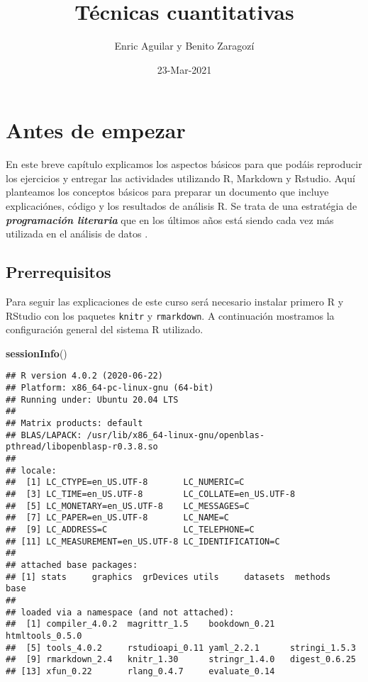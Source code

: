 \documentclass[
]{book}
\title{Técnicas cuantitativas}
\author{Enric Aguilar y Benito Zaragozí}
\date{23-Mar-2021}
\newenvironment{Shaded}{\begin{snugshade}}{\end{snugshade}}
\newcommand{\KeywordTok}[1]{\textcolor[rgb]{0.13,0.29,0.53}{\textbf{#1}}}
\newcommand{\NormalTok}[1]{#1}
\begin{document}
\maketitle

{
\setcounter{tocdepth}{1}
\tableofcontents
}
\hypertarget{antes-de-empezar}{%
\chapter*{Antes de empezar}\label{antes-de-empezar}}

En este breve capítulo explicamos los aspectos básicos para que podáis reproducir los ejercicios y entregar las actividades utilizando R, Markdown y Rstudio. Aquí planteamos los conceptos básicos para preparar un documento que incluye explicaciónes, código y los resultados de análisis R. Se trata de una estratégia de \textbf{\emph{programación literaria}} que en los últimos años está siendo cada vez más utilizada en el análisis de datos \citep{knuth1984literate, xie2015knitr}.

\hypertarget{prerrequisitos}{%
\section{Prerrequisitos}\label{prerrequisitos}}

Para seguir las explicaciones de este curso será necesario instalar primero R y RStudio con los paquetes \texttt{knitr} y \texttt{rmarkdown}. A continuación mostramos la configuración general del sistema R utilizado.

\begin{Shaded}
\begin{Highlighting}[]
\KeywordTok{sessionInfo}\NormalTok{()}
\end{Highlighting}
\end{Shaded}

\begin{verbatim}
## R version 4.0.2 (2020-06-22)
## Platform: x86_64-pc-linux-gnu (64-bit)
## Running under: Ubuntu 20.04 LTS
## 
## Matrix products: default
## BLAS/LAPACK: /usr/lib/x86_64-linux-gnu/openblas-pthread/libopenblasp-r0.3.8.so
## 
## locale:
##  [1] LC_CTYPE=en_US.UTF-8       LC_NUMERIC=C              
##  [3] LC_TIME=en_US.UTF-8        LC_COLLATE=en_US.UTF-8    
##  [5] LC_MONETARY=en_US.UTF-8    LC_MESSAGES=C             
##  [7] LC_PAPER=en_US.UTF-8       LC_NAME=C                 
##  [9] LC_ADDRESS=C               LC_TELEPHONE=C            
## [11] LC_MEASUREMENT=en_US.UTF-8 LC_IDENTIFICATION=C       
## 
## attached base packages:
## [1] stats     graphics  grDevices utils     datasets  methods   base     
## 
## loaded via a namespace (and not attached):
##  [1] compiler_4.0.2  magrittr_1.5    bookdown_0.21   htmltools_0.5.0
##  [5] tools_4.0.2     rstudioapi_0.11 yaml_2.2.1      stringi_1.5.3  
##  [9] rmarkdown_2.4   knitr_1.30      stringr_1.4.0   digest_0.6.25  
## [13] xfun_0.22       rlang_0.4.7     evaluate_0.14
\end{verbatim}
\end{document}

